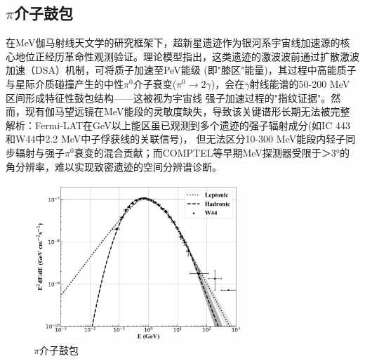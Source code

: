 \subsection{$\pi$介子鼓包}
\label{subsec:pion}
在MeV伽马射线天文学的研究框架下，超新星遗迹作为银河系宇宙线加速源的核心地位正经历革命性观测验证。理论模型指出，这类遗迹的激波波前通过扩散激波加速（DSA）机制，可将质子加速至PeV能级
(即"膝区"能量)，其过程中高能质子与星际介质碰撞产生的中性$\pi^{0}$介子衰变($\pi^{0} \rightarrow 2\gamma$)，会在$\gamma$射线能谱的50-200 MeV区间形成特征性鼓包结构——这被视为宇宙线
强子加速过程的"指纹证据"。然而，现有伽马望远镜在MeV能段的灵敏度缺失，导致该关键谱形长期无法被完整解析：Fermi-LAT在GeV以上能区虽已观测到多个遗迹的强子辐射成分(如IC 443和W44中2.2 MeV中子俘获线的关联信号)，
但无法区分10-300 MeV能段内轻子同步辐射与强子$\pi^{0}$衰变的混合贡献；而COMPTEL等早期MeV探测器受限于＞3°的角分辨率，难以实现致密遗迹的空间分辨谱诊断。
\begin{figure}[H]
	\centering
	\includegraphics[width=0.7\textwidth]{figures/Pi介子鼓包.png}
	\caption{$\pi$介子鼓包} \label{fig:pion}
\end{figure}
